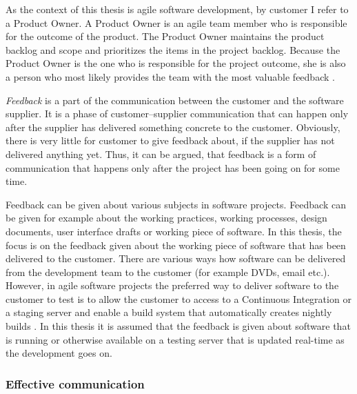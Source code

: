 \documentclass[english,12pt,a4paper,pdftex]{article}
\begin{document}
As the context of this thesis is agile software development, by customer I refer to a Product Owner. A Product Owner is an agile team member who is responsible for the outcome of the product. The Product Owner maintains the product backlog and scope and prioritizes the items in the project backlog. Because the Product Owner is the one who is responsible for the project outcome, she is also a person who most likely provides the team with the most valuable feedback \citep{pichler2010}.

\textit{Feedback} is a part of the communication between the customer and the software supplier. It is a phase of customer--supplier communication that can happen only after the supplier has delivered something concrete to the customer. Obviously, there is very little for customer to give feedback about, if the supplier has not delivered anything yet. Thus, it can be argued, that feedback is a form of communication that happens only after the project has been going on for some time.

Feedback can be given about various subjects in software projects. Feedback can be given for example about the working practices, working processes, design documents, user interface drafts or working piece of software. In this thesis, the focus is on the feedback given about the working piece of software that has been delivered to the customer. There are various ways how software can be delivered from the development team to the customer (for example DVDs, email etc.). However, in agile software projects the preferred way to deliver software to the customer to test is to allow the customer to access to a Continuous Integration or a staging server and enable a build system that automatically creates nightly builds \citep{shore2007} \citep{beck2004}. In this thesis it is assumed that the feedback is given about software that is running or otherwise available on a testing server that is updated real-time as the development goes on.

\subsubsection{Effective communication}

\end{document}
